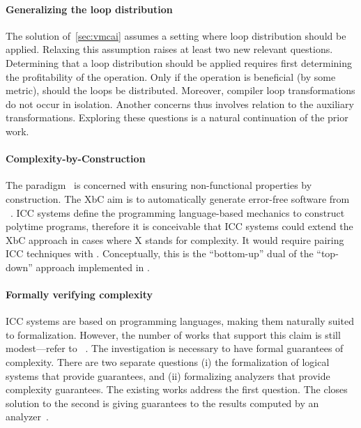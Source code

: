 \paragraph*{Generalizing the loop distribution}
The solution of~\autoref{sec:vmcai} assumes a setting where loop distribution
should be applied. Relaxing this assumption raises at least two new relevant
questions. Determining that a loop distribution should be applied requires first
determining the profitability of the operation. Only if the operation is
beneficial (by some metric), should the loops be distributed. Moreover, compiler
loop transformations do not occur in isolation. Another concerns thus involves
relation to the auxiliary transformations. Exploring these questions is a
natural continuation of the prior work.

\paragraph*{Complexity-by-Construction}
The  paradigm~\cite{terbeek2018} is concerned with
ensuring non-functional properties by
construction. The XbC aim is to automatically generate error-free software from
~\cite{terbeek2020}. ICC systems define the programming
language-based mechanics to construct polytime programs, therefore it is
conceivable that ICC systems could extend the XbC approach in cases where X
stands for complexity. It would require pairing ICC techniques with . Conceptually, this is the \enquote{bottom-up} dual of the
\enquote{top-down} approach implemented in .

\paragraph*{Formally verifying complexity}
ICC systems are based on programming languages, making them naturally suited
to formalization. However, the number of works that support this claim is
still modest---refer to \eg~\cite{feree2018,heraud2011,atkey2024}. The
investigation is necessary to have formal guarantees of complexity. There
are two separate questions (i) the formalization of logical systems that
provide guarantees, and (ii) formalizing analyzers that provide complexity
guarantees. The existing works address the first question. The closes
solution to the second is giving guarantees to the results computed by an
analyzer~\cite{carbonneaux2017}.

